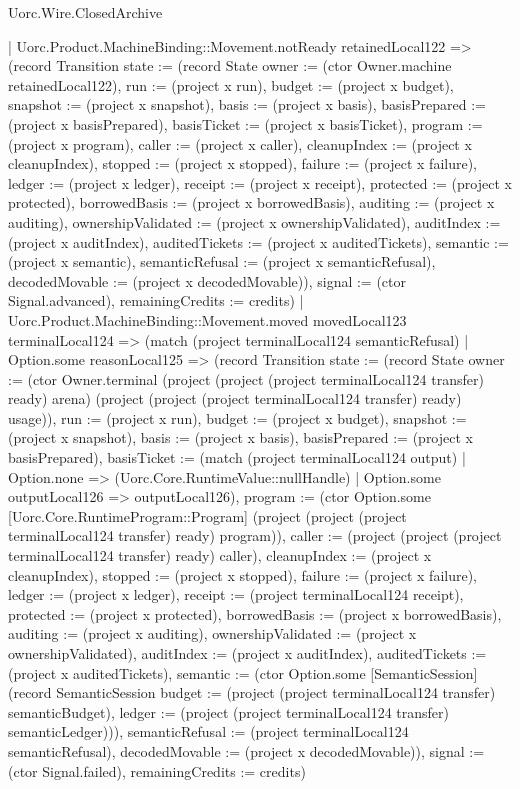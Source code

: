 \begin{lexlean}{Uorc.Wire.ClosedArchive}
\begin{semanticmodule}
{      | Uorc.Product.MachineBinding::Movement.notReady retainedLocal122 => (record Transition {state := (record State {owner := (ctor Owner.machine retainedLocal122), run := (project x run), budget := (project x budget), snapshot := (project x snapshot), basis := (project x basis), basisPrepared := (project x basisPrepared), basisTicket := (project x basisTicket), program := (project x program), caller := (project x caller), cleanupIndex := (project x cleanupIndex), stopped := (project x stopped), failure := (project x failure), ledger := (project x ledger), receipt := (project x receipt), protected := (project x protected), borrowedBasis := (project x borrowedBasis), auditing := (project x auditing), ownershipValidated := (project x ownershipValidated), auditIndex := (project x auditIndex), auditedTickets := (project x auditedTickets), semantic := (project x semantic), semanticRefusal := (project x semanticRefusal), decodedMovable := (project x decodedMovable)}), signal := (ctor Signal.advanced), remainingCredits := credits})
      | Uorc.Product.MachineBinding::Movement.moved movedLocal123 terminalLocal124 => (match (project terminalLocal124 semanticRefusal)
        | Option.some reasonLocal125 => (record Transition {state := (record State {owner := (ctor Owner.terminal (project (project (project terminalLocal124 transfer) ready) arena) (project (project (project terminalLocal124 transfer) ready) usage)), run := (project x run), budget := (project x budget), snapshot := (project x snapshot), basis := (project x basis), basisPrepared := (project x basisPrepared), basisTicket := (match (project terminalLocal124 output)
          | Option.none => (Uorc.Core.RuntimeValue::nullHandle)
          | Option.some outputLocal126 => outputLocal126), program := (ctor Option.some [Uorc.Core.RuntimeProgram::Program] (project (project (project terminalLocal124 transfer) ready) program)), caller := (project (project (project terminalLocal124 transfer) ready) caller), cleanupIndex := (project x cleanupIndex), stopped := (project x stopped), failure := (project x failure), ledger := (project x ledger), receipt := (project terminalLocal124 receipt), protected := (project x protected), borrowedBasis := (project x borrowedBasis), auditing := (project x auditing), ownershipValidated := (project x ownershipValidated), auditIndex := (project x auditIndex), auditedTickets := (project x auditedTickets), semantic := (ctor Option.some [SemanticSession] (record SemanticSession {budget := (project (project terminalLocal124 transfer) semanticBudget), ledger := (project (project terminalLocal124 transfer) semanticLedger)})), semanticRefusal := (project terminalLocal124 semanticRefusal), decodedMovable := (project x decodedMovable)}), signal := (ctor Signal.failed), remainingCredits := credits})
}
\end{semanticmodule}
\end{lexlean}
